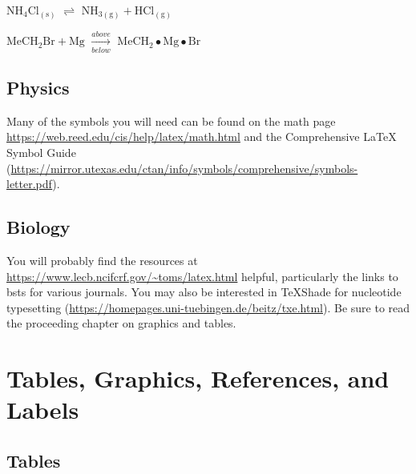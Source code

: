 \documentclass[12pt,twoside]{reedthesis}
\begin{document}
\(\mathrm{NH_4Cl_{(s)}}\) \(\rightleftharpoons\) \(\mathrm{NH_{3(g)}+HCl_{(g)}}\)

\noindent \(\mathrm{MeCH_2Br + Mg}\) \(\xrightarrow[below]{above}\) \(\mathrm{MeCH_2\bullet Mg \bullet Br}\)

\hypertarget{physics}{%
\section{Physics}\label{physics}}

Many of the symbols you will need can be found on the math page \url{https://web.reed.edu/cis/help/latex/math.html} and the Comprehensive LaTeX Symbol Guide (\url{https://mirror.utexas.edu/ctan/info/symbols/comprehensive/symbols-letter.pdf}).

\hypertarget{biology}{%
\section{Biology}\label{biology}}

You will probably find the resources at \url{https://www.lecb.ncifcrf.gov/~toms/latex.html} helpful, particularly the links to bsts for various journals. You may also be interested in TeXShade for nucleotide typesetting (\url{https://homepages.uni-tuebingen.de/beitz/txe.html}). Be sure to read the proceeding chapter on graphics and tables.

\hypertarget{ref-labels}{%
\chapter{Tables, Graphics, References, and Labels}\label{ref-labels}}

\hypertarget{tables}{%
\section{Tables}\label{tables}}
\end{document}
